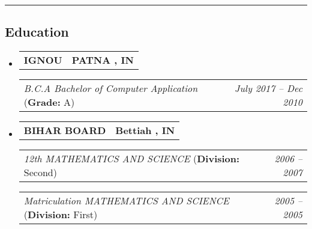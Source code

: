 \documentclass[11pt,letterpaper]{article}
\makeatletter
\newcommand{\headerrow}[2]
{\begin{tabular*}{\linewidth}{l@{\extracolsep{\fill}}r}
#1 &
#2 \\
\end{tabular*}}
\makeatother
\begin{document}
\hrule
\vspace{-1em}
\subsection*{\Large Education}

\begin{itemize}[leftmargin=1em]
	\parskip=0.1em
		
	\item
	      \headerrow
	      {\textbf{IGNOU}}
	      {\textbf{PATNA , IN}}
	      \headerrow
	      {\emph{B.C.A Bachelor of Computer Application} (\textbf{Grade:} A)}
	      {\emph{July 2017 -- Dec 2010}}
	\item
	      \headerrow
	      {\textbf{BIHAR BOARD}}
	      {\textbf{Bettiah , IN}}
	      \headerrow
	      {\emph{12th MATHEMATICS AND SCIENCE} (\textbf{Division:} Second)}
	      {\emph{2006 -- 2007}}
	      \headerrow
	      {\emph{Matriculation MATHEMATICS AND SCIENCE} (\textbf{Division:} First)}
	      {\emph{2005 -- 2005}}
\end{itemize}
\end{document}
